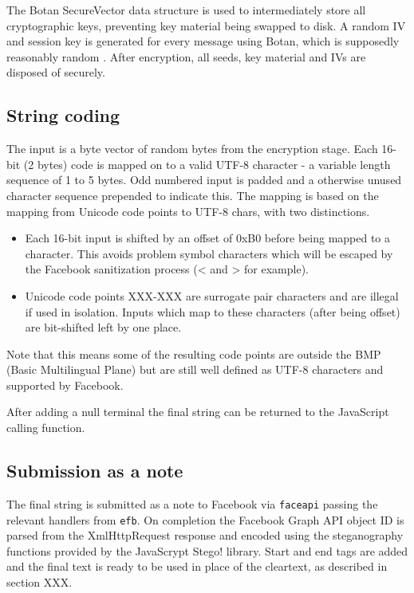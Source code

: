 The Botan SecureVector data structure is used to intermediately store all cryptographic keys, preventing key material being swapped to disk. A random IV and session key is generated for every message using Botan, which is supposedly reasonably random \cite{XXX}. After encryption, all seeds, key material and IVs are disposed of securely.


\FloatBarrier
\subsection{String coding}

The input is a byte vector of random bytes from the encryption stage. Each 16-bit (2 bytes) code is mapped on to a valid UTF-8 character - a variable length sequence of 1 to 5 bytes. Odd numbered input is padded and a otherwise unused character sequence prepended to indicate this. The mapping is based on the mapping from Unicode code points to UTF-8 chars, with two distinctions.

\begin{itemize}

    \item Each 16-bit input is shifted by an offset of 0xB0 before being mapped to a character. This avoids problem symbol characters which will be escaped by the Facebook sanitization process (< and > for example).
    
    \item Unicode code points XXX-XXX are surrogate pair characters and are illegal if used in isolation. Inputs which map to these characters (after being offset) are bit-shifted left by one place.
    
\end{itemize}


Note that this means some of the resulting code points are outside the BMP (Basic Multilingual Plane) but are still well defined as UTF-8 characters and supported by Facebook.

After adding a null terminal the final string can be returned to the JavaScript calling function.


\FloatBarrier
\subsection{Submission as a note}

The final string is submitted as a note to Facebook via {\tt faceapi} passing the relevant handlers from {\tt efb}. On completion the Facebook Graph API object ID is parsed from the XmlHttpRequest response and encoded using the steganography functions provided by the JavaScrypt Stego! library. Start and end tags are added and the final text is ready to be used in place of the cleartext, as described in section XXX.



